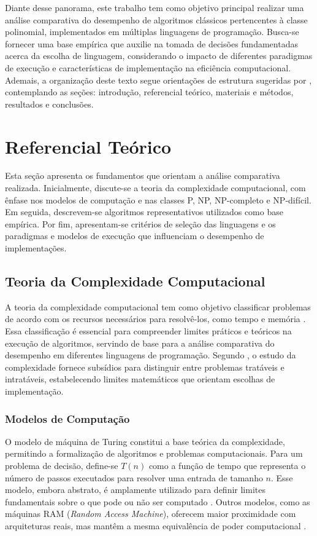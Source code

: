 \documentclass[12pt,a4paper]{article}
\newcommand{\eng}[1]{\textit{#1}}
\begin{document}
Diante desse panorama, este trabalho tem como objetivo principal realizar uma análise comparativa do desempenho de algoritmos clássicos pertencentes à classe polinomial, implementados em múltiplas linguagens de programação. Busca-se fornecer uma base empírica que auxilie na tomada de decisões fundamentadas acerca da escolha de linguagem, considerando o impacto de diferentes paradigmas de execução e características de implementação na eficiência computacional. Ademais, a organização deste texto segue orientações de estrutura sugeridas por , contemplando as seções: introdução, referencial teórico, materiais e métodos, resultados e conclusões.

\section{Referencial Teórico}

Esta seção apresenta os fundamentos que orientam a análise comparativa realizada. Inicialmente, discute-se a teoria da complexidade computacional, com ênfase nos modelos de computação e nas classes P, NP, NP-completo e NP-difícil. Em seguida, descrevem-se algoritmos representativos utilizados como base empírica. Por fim, apresentam-se critérios de seleção das linguagens e os paradigmas e modelos de execução que influenciam o desempenho de implementações.

\subsection{Teoria da Complexidade Computacional}
A teoria da complexidade computacional tem como objetivo classificar problemas de acordo com os recursos necessários para resolvê-los, como tempo e memória . Essa classificação é essencial para compreender limites práticos e teóricos na execução de algoritmos, servindo de base para a análise comparativa do desempenho em diferentes linguagens de programação. Segundo , o estudo da complexidade fornece subsídios para distinguir entre problemas tratáveis e intratáveis, estabelecendo limites matemáticos que orientam escolhas de implementação.

\subsubsection{Modelos de Computação}
O modelo de máquina de Turing constitui a base teórica da complexidade, permitindo a formalização de algoritmos e problemas computacionais. Para um problema de decisão, define-se \(T(n)\) como a função de tempo que representa o número de passos executados para resolver uma entrada de tamanho \(n\). Esse modelo, embora abstrato, é amplamente utilizado para definir limites fundamentais sobre o que pode ou não ser computado \cite{sipser2012}. Outros modelos, como as máquinas RAM (\eng{Random Access Machine}), oferecem maior proximidade com arquiteturas reais, mas mantêm a mesma equivalência de poder computacional \cite{knuth1998}.
\end{document}
